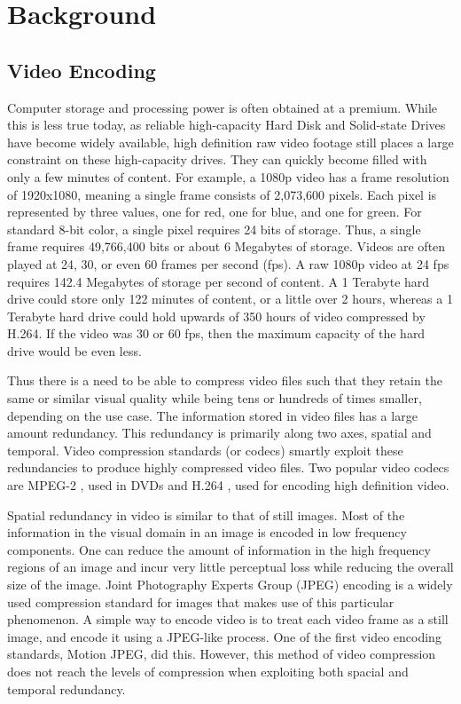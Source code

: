\chapter{Background}

\section{Video Encoding}

Computer storage and processing power is often obtained at a premium. While this is less true today, as reliable high-capacity Hard Disk and Solid-state Drives have become widely available, high definition raw video footage still places a large constraint on these high-capacity drives. They can quickly become filled with only a few minutes of content. For example, a 1080p video has a frame resolution of 1920x1080, meaning a single frame consists of 2,073,600 pixels. Each pixel is represented by three values, one for red, one for blue, and one for green. For standard 8-bit color, a single pixel requires 24 bits of storage. Thus, a single frame requires 49,766,400 bits or about 6 Megabytes of storage. Videos are often played at 24, 30, or even 60 frames per second (fps). A raw 1080p video at 24 fps requires 142.4 Megabytes of storage per second of content. A 1 Terabyte hard drive could store only 122 minutes of content, or a little over 2 hours, whereas a 1 Terabyte hard drive could hold upwards of 350 hours of video compressed by H.264. If the video was 30 or 60 fps, then the maximum capacity of the hard drive would be even less.

Thus there is a need to be able to compress video files such that they retain the same or similar visual quality while being tens or hundreds of times smaller, depending on the use case. The information stored in video files has a large amount redundancy. This redundancy is primarily along two axes, spatial and temporal. Video compression standards (or codecs) smartly exploit these redundancies to produce highly compressed video files. Two popular video codecs are MPEG-2 \cite{mpeg2}, used in DVDs and H.264 \cite{h264}, used for encoding high definition video.

Spatial redundancy in video is similar to that of still images. Most of the information in the visual domain in an image is encoded in low frequency components. One can reduce the amount of information in the high frequency regions of an image and incur very little perceptual loss while reducing the overall size of the image. Joint Photography Experts Group (JPEG) encoding is a widely used compression standard for images that makes use of this particular phenomenon. A simple way to encode video is to treat each video frame as a still image, and encode it using a JPEG-like process. One of the first video encoding standards, Motion JPEG, did this. However, this method of video compression does not reach the levels of compression when exploiting both spacial and temporal redundancy.

